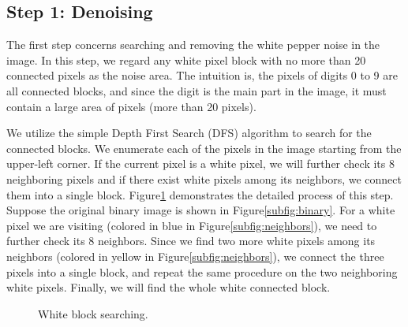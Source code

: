 \documentclass{article}
\begin{document}
\subsection{Step 1: Denoising}
The first step concerns searching and removing the white pepper noise in the image. In this step, we regard any white pixel block with no more than 20 connected pixels as the noise area. The intuition is, the pixels of digits 0 to 9 are all connected blocks, and since the digit is the main part in the image, it must contain a large area of pixels (more than 20 pixels). 

We utilize the simple Depth First Search (DFS) algorithm to search for the connected blocks. We enumerate each of the pixels in the image starting from the upper-left corner. If the current pixel is a white pixel, we will further check its 8 neighboring pixels and if there exist white pixels among its neighbors, we connect them into a single block. Figure\ref{fig:DFS} demonstrates the detailed process of this step. Suppose the original binary image is shown in Figure\ref{subfig:binary}. For a white pixel we are visiting (colored in blue in Figure\ref{subfig:neighbors}), we need to further check its 8 neighbors. Since we find two more white pixels among its neighbors (colored in yellow in Figure\ref{subfig:neighbors}), we connect the three pixels into a single block, and repeat the same procedure on the two neighboring white pixels. Finally, we will find the whole white connected block. 

\begin{figure}[!htb]
	\centering
	\hspace{.2in}
	\caption{White block searching.}
	\label{fig:DFS}
\end{figure}
\end{document}
